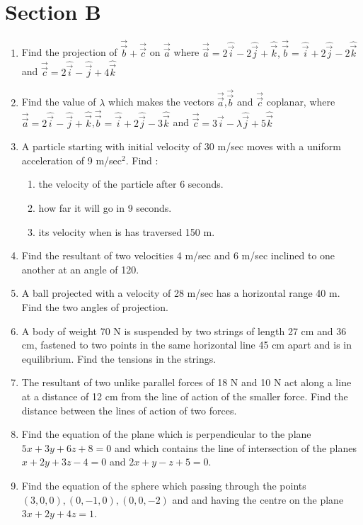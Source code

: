 \documentclass[journal,12pt,twocolumn]{IEEEtran}
\renewcommand\thesection{\arabic{section}}
\begin{document}
\section{Section B}
\renewcommand{\theequation}{\theenumi}
\begin{enumerate}[label=\thesection.\arabic*.,ref=\thesection.\theenumi]
\item Find the projection of $\overrightarrow{\vec{b}}+\overrightarrow{\vec{c}}$ on $\overrightarrow{\vec{a}}$ where $\overrightarrow{\vec{a}}=2\hat{\vec{i}}-2\hat{\vec{j}}+\hat{\vec{k}} , \overrightarrow{\vec{b}}=\hat{\vec{i}}+2\hat{\vec{j}}-2\hat{\vec{k}}$ and $ \overrightarrow{\vec{c}}=2\hat{\vec{i}}-\hat{\vec{j}}+4\hat{\vec{k}}$

 \item Find the value of $\lambda$ which makes the vectors $\overrightarrow{\vec{a}}$,$\overrightarrow{\vec{b}}$ and $\overrightarrow{\vec{c}}$ coplanar, where $ \overrightarrow{\vec{a}}=2\hat{\vec{i}}-\hat{\vec{j}}+\hat{\vec{k}}$,$ \overrightarrow{\vec{b}}=\hat{\vec{i}}+2\hat{\vec{j}}-3\hat{\vec{k}}$ and $ \overrightarrow{\vec{c}}=3\hat{\vec{i}}-\lambda\hat{\vec{j}}+5\hat{\vec{k}}$

\item  A particle starting with initial velocity of 30 m/sec moves with a uniform acceleration of 9 m/sec$^2$. Find :
\begin{enumerate}
   \item the velocity of the particle after 6 seconds.
   \item how far it will go in 9 seconds.
   \item its velocity when is has traversed 150 m.
\end{enumerate}
\item Find the resultant of two velocities 4 m/sec and 6 m/sec inclined to one another at an angle of 120\degree.
\item A ball projected with a velocity of 28 m/sec has a horizontal range 40 m. Find the two angles of projection.
\item A body of weight 70 N is suspended by two strings of length 27 cm and 36 cm, fastened to two points in the same horizontal line 45 cm apart and is in equilibrium. Find the tensions in the strings.
\item The resultant of two unlike parallel forces of 18 N and 10 N act along a line at a distance of 12 cm from the line of action of the smaller force. Find the distance between the lines of action of two forces.
\item Find the equation of the plane which is perpendicular to the plane $5x + 3y + 6 z + 8 = 0$ and which contains the line of intersection of the planes $x + 2y + 3z - 4 = 0 $ and $2x + y - z + 5 = 0$.
\item Find the equation of the sphere which passing through the points $ (3, 0, 0), (0, -1, 0), (0, 0, -2)$ and and having the centre on the plane $3x + 2y + 4z = 1$.
 \end{enumerate}
\end{document}
